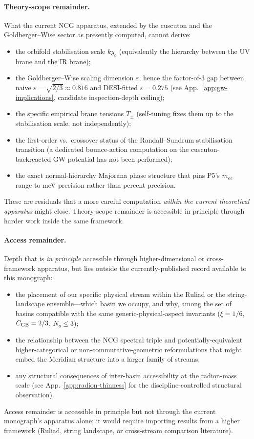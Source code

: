 \paragraph{Theory-scope remainder.}
What the current NCG apparatus, extended by the cuscuton and the Goldberger--Wise sector as presently computed, cannot derive:
\begin{itemize}\setlength{\itemsep}{0pt}
  \item the orbifold stabilisation scale $k y_c$ (equivalently the hierarchy between the UV brane and the IR brane);
  \item the Goldberger--Wise scaling dimension $\varepsilon$, hence the factor-of-3 gap between naive $\varepsilon = \sqrt{2/3} \approx 0.816$ and DESI-fitted $\varepsilon = 0.275$ (see App.~\ref{app:gw-implications}, candidate inspection-depth ceiling);
  \item the specific empirical brane tensions $T_\pm$ (self-tuning fixes them up to the stabilisation scale, not independently);
  \item the first-order vs.\ crossover status of the Randall--Sundrum stabilisation transition (a dedicated bounce-action computation on the cuscuton-backreacted GW potential has not been performed);
  \item the exact normal-hierarchy Majorana phase structure that pins P5's $m_{ee}$ range to meV precision rather than percent precision.
\end{itemize}
These are residuals that a more careful computation \emph{within the current theoretical apparatus} might close.  Theory-scope remainder is accessible in principle through harder work inside the same framework.

\paragraph{Access remainder.}
Depth that is \emph{in principle} accessible through higher-dimensional or cross-framework apparatus, but lies outside the currently-published record available to this monograph:
\begin{itemize}\setlength{\itemsep}{0pt}
  \item the placement of our specific physical stream within the Ruliad or the string-landscape ensemble---which basin we occupy, and why, among the set of basins compatible with the same generic-physical-aspect invariants ($\xi = 1/6$, $C_{\mathrm{GB}} = 2/3$, $N_g \leq 3$);
  \item the relationship between the NCG spectral triple and potentially-equivalent higher-categorical or non-commutative-geometric reformulations that might embed the Meridian structure into a larger family of streams;
  \item any structural consequences of inter-basin accessibility at the radion-mass scale (see App.~\ref{app:radion-thinness} for the discipline-controlled structural observation).
\end{itemize}
Access remainder is accessible in principle but not through the current monograph's apparatus alone; it would require importing results from a higher framework (Ruliad, string landscape, or cross-stream comparison literature).

